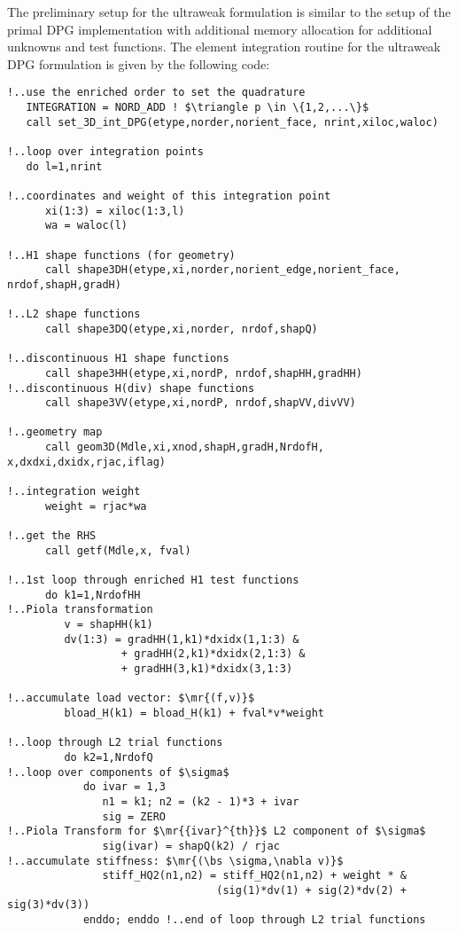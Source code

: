 The preliminary setup for the ultraweak formulation is similar to the setup of the primal DPG implementation with additional memory allocation for additional unknowns and test functions. The element integration routine for the ultraweak DPG formulation is given by the following code:
\begin{lstlisting}[mathescape,caption=\file{POISSON/ULTRAWEAK\_DPG/}\routine{elem}: element integration]
!..use the enriched order to set the quadrature
   INTEGRATION = NORD_ADD ! $\triangle p \in \{1,2,...\}$
   call set_3D_int_DPG(etype,norder,norient_face, nrint,xiloc,waloc)

!..loop over integration points
   do l=1,nrint

!..coordinates and weight of this integration point
      xi(1:3) = xiloc(1:3,l)
      wa = waloc(l)

!..H1 shape functions (for geometry)
      call shape3DH(etype,xi,norder,norient_edge,norient_face, nrdof,shapH,gradH)

!..L2 shape functions
      call shape3DQ(etype,xi,norder, nrdof,shapQ)

!..discontinuous H1 shape functions
      call shape3HH(etype,xi,nordP, nrdof,shapHH,gradHH)
!..discontinuous H(div) shape functions
      call shape3VV(etype,xi,nordP, nrdof,shapVV,divVV)

!..geometry map
      call geom3D(Mdle,xi,xnod,shapH,gradH,NrdofH, x,dxdxi,dxidx,rjac,iflag)

!..integration weight
      weight = rjac*wa

!..get the RHS
      call getf(Mdle,x, fval)

!..1st loop through enriched H1 test functions
      do k1=1,NrdofHH
!..Piola transformation
         v = shapHH(k1)
         dv(1:3) = gradHH(1,k1)*dxidx(1,1:3) &
                  + gradHH(2,k1)*dxidx(2,1:3) &
                  + gradHH(3,k1)*dxidx(3,1:3)

!..accumulate load vector: $\mr{(f,v)}$
         bload_H(k1) = bload_H(k1) + fval*v*weight

!..loop through L2 trial functions
         do k2=1,NrdofQ
!..loop over components of $\sigma$
            do ivar = 1,3
               n1 = k1; n2 = (k2 - 1)*3 + ivar
               sig = ZERO
!..Piola Transform for $\mr{{ivar}^{th}}$ L2 component of $\sigma$
               sig(ivar) = shapQ(k2) / rjac
!..accumulate stiffness: $\mr{(\bs \sigma,\nabla v)}$
               stiff_HQ2(n1,n2) = stiff_HQ2(n1,n2) + weight * &
               	                 (sig(1)*dv(1) + sig(2)*dv(2) + sig(3)*dv(3))
            enddo; enddo !..end of loop through L2 trial functions


\end{lstlisting}
